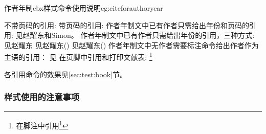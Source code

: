 \begin{example}{作者年制cbx样式命令使用说明}{eg:citeforauthoryear}
\begin{texlist}
不带页码的引用:
    \cite{Peebles2001-100-100}  \parencite{Miroslav2004--}
带页码的引用:
    \cite[见][49页]{蔡敏2006--} \parencite[见][49页]{Miroslav2004--}
作者年制文中已有作者只需给出年份和页码的引用:
    见赵耀东和Simon。
作者年制文中已有作者只需给出年份的引用，三种方式:
    见赵耀东
    见赵耀东(\cite*{赵耀东1998--})
    见赵耀东(\citeyear{赵耀东1998--})
作者年制文中无作者需要标注命令给出作者作为主语的引用：
    见\textcite{赵耀东1998--}
在页脚中引用和打印文献表:
    \footnote{在脚注中引用\footcite{赵学功2001--}} 
    \end{texlist}
\end{example}

各引用命令的效果见\ref{sec:test:book}节。%

\subsubsection{样式使用的注意事项}

